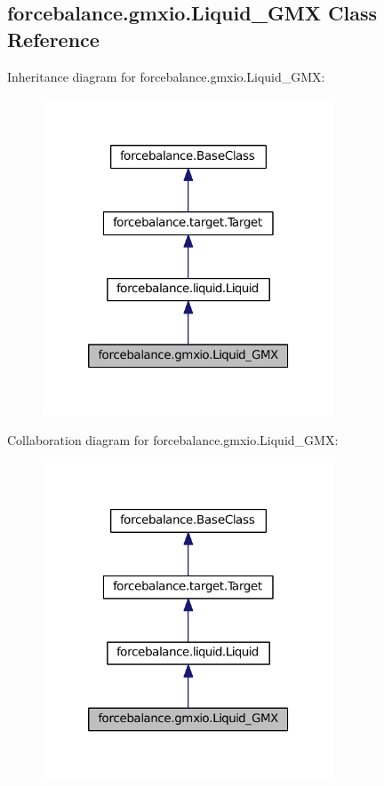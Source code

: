 \hypertarget{classforcebalance_1_1gmxio_1_1Liquid__GMX}{\subsection{forcebalance.\-gmxio.\-Liquid\-\_\-\-G\-M\-X \-Class \-Reference}
\label{classforcebalance_1_1gmxio_1_1Liquid__GMX}
}


\-Inheritance diagram for forcebalance.\-gmxio.\-Liquid\-\_\-\-G\-M\-X\-:\nopagebreak
\begin{figure}[H]
\begin{center}
\leavevmode
\includegraphics[width=246pt]{classforcebalance_1_1gmxio_1_1Liquid__GMX__inherit__graph}
\end{center}
\end{figure}


\-Collaboration diagram for forcebalance.\-gmxio.\-Liquid\-\_\-\-G\-M\-X\-:\nopagebreak
\begin{figure}[H]
\begin{center}
\leavevmode
\includegraphics[width=246pt]{classforcebalance_1_1gmxio_1_1Liquid__GMX__coll__graph}
\end{center}
\end{figure}
